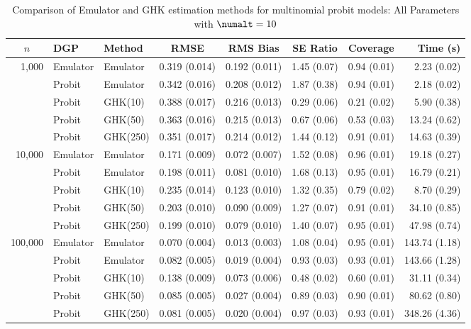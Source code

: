 \begin{table}[htbp]
\centering
\footnotesize
\begin{tabular}{@{}rllrrrrr@{}}
\toprule
\multicolumn{1}{c}{$n$} & \multicolumn{1}{l}{DGP} & \multicolumn{1}{l}{Method} & \multicolumn{1}{c}{RMSE} & \multicolumn{1}{c}{RMS Bias} & \multicolumn{1}{c}{SE Ratio} & \multicolumn{1}{c}{Coverage} & \multicolumn{1}{r}{Time (s)} \\
\midrule
\multirow{5}{*}{1,000} & Emulator & Emulator & 0.319 (0.014) & 0.192 (0.011) & 1.45 (0.07) & 0.94 (0.01) & 2.23 (0.02) \\
 & Probit & Emulator & 0.342 (0.016) & 0.208 (0.012) & 1.87 (0.38) & 0.94 (0.01) & 2.18 (0.02) \\
 & Probit & GHK(10) & 0.388 (0.017) & 0.216 (0.013) & 0.29 (0.06) & 0.21 (0.02) & 5.90 (0.38) \\
 & Probit & GHK(50) & 0.363 (0.016) & 0.215 (0.013) & 0.67 (0.06) & 0.53 (0.03) & 13.24 (0.62) \\
 & Probit & GHK(250) & 0.351 (0.017) & 0.214 (0.012) & 1.44 (0.12) & 0.91 (0.01) & 14.63 (0.39) \\
\midrule
\multirow{5}{*}{10,000} & Emulator & Emulator & 0.171 (0.009) & 0.072 (0.007) & 1.52 (0.08) & 0.96 (0.01) & 19.18 (0.27) \\
 & Probit & Emulator & 0.198 (0.011) & 0.081 (0.010) & 1.68 (0.13) & 0.95 (0.01) & 16.79 (0.21) \\
 & Probit & GHK(10) & 0.235 (0.014) & 0.123 (0.010) & 1.32 (0.35) & 0.79 (0.02) & 8.70 (0.29) \\
 & Probit & GHK(50) & 0.203 (0.010) & 0.090 (0.009) & 1.27 (0.07) & 0.91 (0.01) & 34.10 (0.85) \\
 & Probit & GHK(250) & 0.199 (0.010) & 0.079 (0.010) & 1.40 (0.07) & 0.95 (0.01) & 47.98 (0.74) \\
\midrule
\multirow{5}{*}{100,000} & Emulator & Emulator & 0.070 (0.004) & 0.013 (0.003) & 1.08 (0.04) & 0.95 (0.01) & 143.74 (1.18) \\
 & Probit & Emulator & 0.082 (0.005) & 0.019 (0.004) & 0.93 (0.03) & 0.93 (0.01) & 143.66 (1.28) \\
 & Probit & GHK(10) & 0.138 (0.009) & 0.073 (0.006) & 0.48 (0.02) & 0.60 (0.01) & 31.11 (0.34) \\
 & Probit & GHK(50) & 0.085 (0.005) & 0.027 (0.004) & 0.89 (0.03) & 0.90 (0.01) & 80.62 (0.80) \\
 & Probit & GHK(250) & 0.081 (0.005) & 0.020 (0.004) & 0.97 (0.03) & 0.93 (0.01) & 348.26 (4.36) \\
\bottomrule
\end{tabular}
\caption{Comparison of Emulator and GHK estimation methods for multinomial probit models: All Parameters with $\numalt=10$}
\label{tab:emulator_vs_ghk:10:all}
\end{table}
